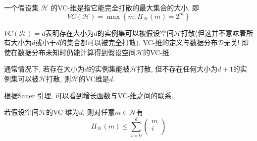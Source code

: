 \begin{definition}[VC-维]
一个假设集 $\mathcal{H}$ 的VC-维是指它能完全打散的最大集合的大小, 即
\begin{equation}
VC\left( \mathcal{H} \right) =\max\left\{ m:\Pi _{\mathcal{H}}\left( m \right) =2^m\right\}
\end{equation}
\end{definition}

$VC\left( \mathcal{H} \right) =d$表明存在大小为$d$的实例集可以被假设空间$\mathcal{H}$打散(但这并不意味着所有大小为$d$或小于$d$的集合都可以被完全打散). VC-维的定义与数据分布$\mathcal{D}$无关! 即使在数据分布未知时仍能计算得到假设空间$\mathcal{H}$的VC-维.

通常情况下, 若存在大小为$d$的实例集能被$\mathcal{H}$打散, 但不存在任何大小为$d+1$的实例集可以被$\mathcal{H}$打散, 则$\mathcal{H}$的VC维是$d$.

根据Sauer 引理, 可以看到增长函数与VC-维之间的联系. 

\begin{theorem}[Sauer 引理]\label{thm:Sauer}
若假设空间$\mathcal{H}$的VC-维为$d$, 则对任意$m\in \mathcal{N}$有
\begin{equation}
\Pi _{\mathcal{H}}\left( m \right) \le \sum_{i=0}^d{\left( \begin{array}{c}
	m\\
	i\\
\end{array} \right)}
\end{equation}
\end{theorem}

